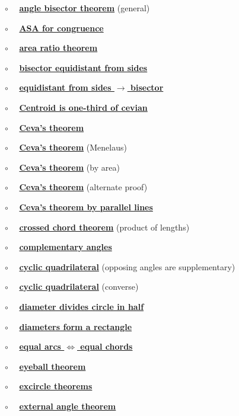 \documentclass[11pt, oneside]{article}
\begin{document}
$\circ$ \ \ \hyperref[sec:generalized_angle_bisector_theorem]{\textbf{angle bisector theorem}} (general)

$\circ$ \ \ \hyperref[sec:ASA]{\textbf{ASA for congruence}}

$\circ$ \ \ \hyperref[sec:area_ratio_theorem]{\textbf{area ratio theorem}}

$\circ$ \ \ \hyperref[sec:bisector_equidistant_sides]{\textbf{bisector equidistant from sides}}

$\circ$ \ \ \hyperref[sec:bisector_equidistant_sides_converse]{\textbf{equidistant from sides $\rightarrow$ bisector}}

$\circ$ \ \ \hyperref[sec:centroid_one_third]{\textbf{Centroid is one-third of cevian}}

$\circ$ \ \ \hyperref[sec:Ceva_theorem]{\textbf{Ceva's theorem}}

$\circ$ \ \ \hyperref[sec:ceva_by_menlaus]{\textbf{Ceva's theorem}} (Menelaus)

$\circ$ \ \ \hyperref[sec:ceva_by_area]{\textbf{Ceva's theorem}} (by area)

$\circ$ \ \ \hyperref[sec:ceva_alternate_proof]{\textbf{Ceva's theorem}} (alternate proof)

$\circ$ \ \ \hyperref[sec:ceva_parallel_lines]{\textbf{Ceva's theorem by parallel lines}}

$\circ$ \ \ \hyperref[sec:Euclid_III_35]{\textbf{crossed chord theorem}} (product of lengths)

$\circ$ \ \ \hyperref[sec:complementary_angle_theorem]{\textbf{complementary angles}}

$\circ$ \ \ \hyperref[sec:quadrilateral_supplementary]{\textbf{cyclic quadrilateral}} (opposing angles are supplementary)

$\circ$ \ \ \hyperref[sec:inscribed_angles_converse]{\textbf{cyclic quadrilateral}} (converse)

$\circ$ \ \ \hyperref[sec:diameter_of_a_circle]{\textbf{diameter divides circle in half}}

$\circ$ \ \ \hyperref[sec:diameters_form_rectangle]{\textbf{diameters form a rectangle}}

$\circ$ \ \ \hyperref[sec:equal_arcs_equal_chords]{\textbf{equal arcs $\iff$ equal chords}}

$\circ$ \ \ \hyperref[sec:eyeball_theorem]{\textbf{eyeball theorem}}

$\circ$ \ \ \hyperref[sec:excircle_theorems]{\textbf{excircle theorems}}

$\circ$ \ \ \hyperref[sec:external_angle_theorem]{\textbf{external angle theorem}}
\end{document}
